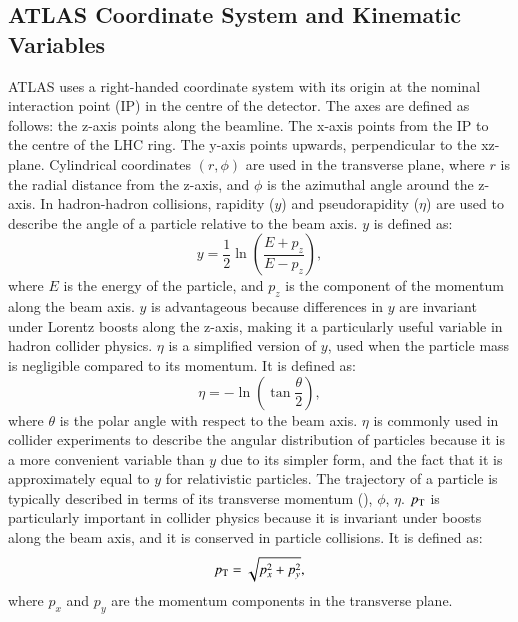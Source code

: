     \subsection{ATLAS Coordinate System and Kinematic Variables}
        ATLAS uses a right-handed coordinate system with its origin at the nominal 
        interaction point (IP) in the centre of the detector. The axes are defined as follows:
        the z-axis points along the beamline.
        The x-axis points from the IP to the centre of the LHC ring. 
        The y-axis points upwards, perpendicular to the xz-plane.
        Cylindrical coordinates $(r, \phi)$ are used in the transverse plane, where $r$ is the radial 
        distance from the z-axis, and $\phi$ is the azimuthal angle around the z-axis. 
        In hadron-hadron collisions, rapidity ($y$) 
        and pseudorapidity ($\eta$) are used to describe the angle of a particle relative to the beam axis.
        $y$ is defined as:
        \[
        y = \frac{1}{2} \ln \left( \frac{E + p_z}{E - p_z} \right),
        \]
        where \( E \) is the energy of the particle, and \( p_z \) is the component of the momentum along the beam axis.
        $y$ is advantageous because differences in $y$ are invariant under Lorentz 
        boosts along the z-axis, making it a particularly useful variable in hadron collider physics.
        $\eta$ is a simplified version of $y$, used when the particle mass is negligible compared to its momentum. 
        It is defined as:
        \[
        \eta = -\ln \left( \tan \frac{\theta}{2} \right),
        \]
        where \( \theta \) is the polar angle with respect to the beam axis. 
        $\eta$ is commonly used in collider experiments to describe the angular distribution of particles because it is 
        a more convenient variable than $y$ due to its simpler form, and the fact that it is approximately equal to $y$ 
        for relativistic particles.
        The trajectory of a particle is typically described in terms of its transverse momentum (\pt), $\phi$, $\eta$. 
        $p_{\text{T}}$ is particularly important in collider physics because it is invariant under 
        boosts along the beam axis, and it is conserved in particle collisions. It is defined as:
        \[
        p_{\text{T}} = \sqrt{p_x^2 + p_y^2},
        \]
        where \( p_x \) and \( p_y \) are the momentum components in the transverse plane.

